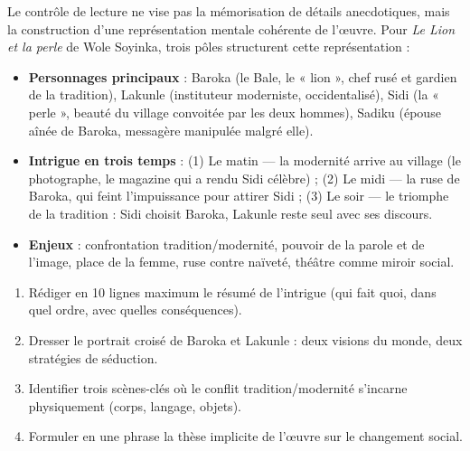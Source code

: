 \documentclass[11pt]{article}
\newcommand{\cle}[1]{{\popxbold\color{popdark}#1}}
\begin{document}
Le contrôle de lecture ne vise pas la mémorisation de détails anecdotiques, mais la construction d'une \cle{représentation mentale} cohérente de l'œuvre. Pour \emph{Le Lion et la perle} de Wole Soyinka, trois pôles structurent cette représentation :

\begin{itemize}
    \item \textbf{Personnages principaux} : Baroka (le Bale, le « lion », chef rusé et gardien de la tradition), Lakunle (instituteur moderniste, occidentalisé), Sidi (la « perle », beauté du village convoitée par les deux hommes), Sadiku (épouse aînée de Baroka, messagère manipulée malgré elle).
    \item \textbf{Intrigue en trois temps} : (1) Le matin — la modernité arrive au village (le photographe, le magazine qui a rendu Sidi célèbre) ; (2) Le midi — la ruse de Baroka, qui feint l'impuissance pour attirer Sidi ; (3) Le soir — le triomphe de la tradition : Sidi choisit Baroka, Lakunle reste seul avec ses discours.
    \item \textbf{Enjeux} : confrontation tradition/modernité, pouvoir de la parole et de l'image, place de la femme, ruse contre naïveté, théâtre comme miroir social.
\end{itemize}

\begin{methode}
\begin{enumerate}
    \item Rédiger en 10 lignes maximum le résumé de l'intrigue (qui fait quoi, dans quel ordre, avec quelles conséquences).
    \item Dresser le portrait croisé de Baroka et Lakunle : deux visions du monde, deux stratégies de séduction.
    \item Identifier trois scènes-clés où le conflit tradition/modernité s'incarne physiquement (corps, langage, objets).
    \item Formuler en une phrase la thèse implicite de l'œuvre sur le changement social.
\end{enumerate}
\end{methode}
\end{document}
